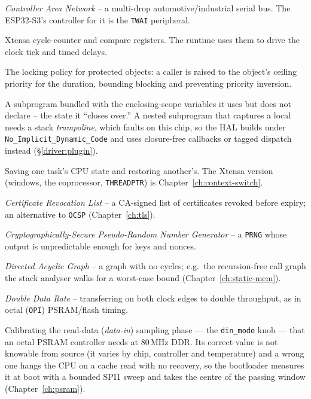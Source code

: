 \begin{description}[style=nextline, leftmargin=0pt]
\item[CAN] \emph{Controller Area Network} -- a multi-drop automotive/industrial serial bus. The ESP32-S3's controller for it is the \texttt{TWAI} peripheral.

\item[CCOUNT / CCOMPARE] Xtensa cycle-counter and compare registers. The runtime
  uses them to drive the clock tick and timed delays.

\item[ceiling priority] The locking policy for protected objects: a caller is
  raised to the object's ceiling priority for the duration, bounding blocking and
  preventing priority inversion.

\item[closure] A subprogram bundled with the enclosing-scope variables it uses but
  does not declare -- the state it ``closes over.'' A nested subprogram that
  captures a local needs a stack \emph{trampoline}, which faults on this chip, so
  the HAL builds under \texttt{No\_Implicit\_Dynamic\_Code} and uses closure-free
  callbacks or tagged dispatch instead (\S\ref{driver:plugin}).

\item[context switch] Saving one task's CPU state and restoring another's. The
  Xtensa version (windows, the coprocessor, \texttt{THREADPTR}) is
  Chapter~\ref{ch:context-switch}.

\item[CRL] \emph{Certificate Revocation List} -- a CA-signed list of certificates revoked before expiry; an alternative to \texttt{OCSP} (Chapter~\ref{ch:tls}).

\item[CSPRNG] \emph{Cryptographically-Secure Pseudo-Random Number Generator} -- a \texttt{PRNG} whose output is unpredictable enough for keys and nonces.

\item[DAG] \emph{Directed Acyclic Graph} -- a graph with no cycles; e.g.\ the recursion-free call graph the stack analyser walks for a worst-case bound (Chapter~\ref{ch:static-mem}).

\item[DDR] \emph{Double Data Rate} -- transferring on both clock edges to double throughput, as in octal (\texttt{OPI}) PSRAM/flash timing.

\item[din tuning] Calibrating the read-data (\emph{data-in}) sampling phase --- the \texttt{din\_mode} knob --- that an octal PSRAM controller needs at 80\,MHz DDR. Its correct value is not knowable from source (it varies by chip, controller and temperature) and a wrong one hangs the CPU on a cache read with no recovery, so the bootloader measures it at boot with a bounded SPI1 sweep and takes the centre of the passing window (Chapter~\ref{ch:psram}).


\end{description}
